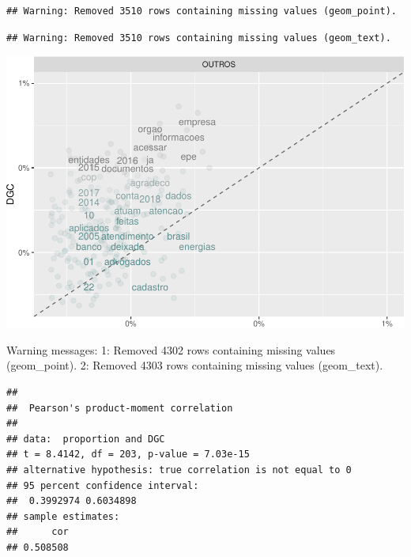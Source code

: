 \documentclass[]{article}
\newenvironment{Shaded}{\begin{snugshade}}{\end{snugshade}}
\newcommand{\KeywordTok}[1]{\textcolor[rgb]{0.13,0.29,0.53}{\textbf{#1}}}
\newcommand{\DataTypeTok}[1]{\textcolor[rgb]{0.13,0.29,0.53}{#1}}
\newcommand{\StringTok}[1]{\textcolor[rgb]{0.31,0.60,0.02}{#1}}
\newcommand{\FunctionTok}[1]{\textcolor[rgb]{0.00,0.00,0.00}{#1}}
\newcommand{\OperatorTok}[1]{\textcolor[rgb]{0.81,0.36,0.00}{\textbf{#1}}}
\newcommand{\AttributeTok}[1]{\textcolor[rgb]{0.77,0.63,0.00}{#1}}
\newcommand{\NormalTok}[1]{#1}
\begin{document}
\begin{verbatim}
## Warning: Removed 3510 rows containing missing values (geom_point).
\end{verbatim}

\begin{verbatim}
## Warning: Removed 3510 rows containing missing values (geom_text).
\end{verbatim}

\includegraphics{markdown_v30_files/figure-latex/unnamed-chunk-71-1.pdf}

\begin{Shaded}
\begin{Highlighting}[]
\FunctionTok{Warning messages:}
\FunctionTok{1:}\AttributeTok{ Removed 4302 rows containing missing values (geom_point). }
\FunctionTok{2:}\AttributeTok{ Removed 4303 rows containing missing values (geom_text).}
\end{Highlighting}
\end{Shaded}

\begin{Shaded}
\end{Shaded}

\begin{verbatim}
## 
##  Pearson's product-moment correlation
## 
## data:  proportion and DGC
## t = 8.4142, df = 203, p-value = 7.03e-15
## alternative hypothesis: true correlation is not equal to 0
## 95 percent confidence interval:
##  0.3992974 0.6034898
## sample estimates:
##      cor 
## 0.508508
\end{verbatim}
\end{document}
